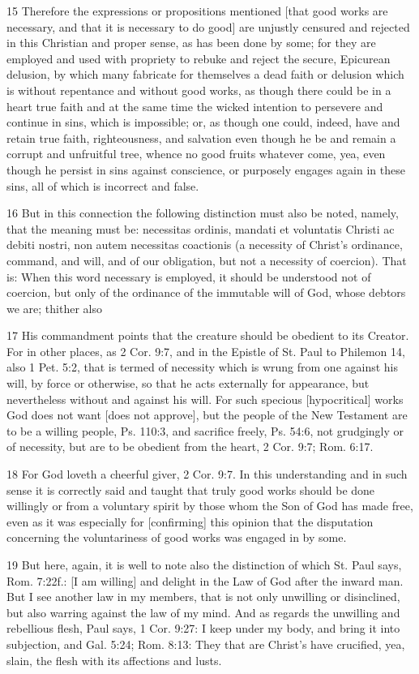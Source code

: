 15 Therefore the expressions or propositions mentioned [that good works are necessary, and that it is necessary to do good] are unjustly censured and rejected in this Christian and proper sense, as has been done by some; for they are employed and used with propriety to rebuke and reject the secure, Epicurean delusion, by which many fabricate for themselves a dead faith or delusion which is without repentance and without good works, as though there could be in a heart true faith and at the same time the wicked intention to persevere and continue in sins, which is impossible; or, as though one could, indeed, have and retain true faith, righteousness, and salvation even though he be and remain a corrupt and unfruitful tree, whence no good fruits whatever come, yea, even though he persist in sins against conscience, or purposely engages again in these sins, all of which is incorrect and false.

16 But in this connection the following distinction must also be noted, namely, that the meaning must be: necessitas ordinis, mandati et voluntatis Christi ac debiti nostri, non autem necessitas coactionis (a necessity of Christ’s ordinance, command, and will, and of our obligation, but not a necessity of coercion). That is: When this word necessary is employed, it should be understood not of coercion, but only of the ordinance of the immutable will of God, whose debtors we are; thither also

17 His commandment points that the creature should be obedient to its Creator. For in other places, as 2 Cor. 9:7, and in the Epistle of St. Paul to Philemon 14, also 1 Pet. 5:2, that is termed of necessity which is wrung from one against his will, by force or otherwise, so that he acts externally for appearance, but nevertheless without and against his will. For such specious [hypocritical] works God does not want [does not approve], but the people of the New Testament are to be a willing people, Ps. 110:3, and sacrifice freely, Ps. 54:6, not grudgingly or of necessity, but are to be obedient from the heart, 2 Cor. 9:7; Rom. 6:17.

18 For God loveth a cheerful giver, 2 Cor. 9:7. In this understanding and in such sense it is correctly said and taught that truly good works should be done willingly or from a voluntary spirit by those whom the Son of God has made free, even as it was especially for [confirming] this opinion that the disputation concerning the voluntariness of good works was engaged in by some.

19 But here, again, it is well to note also the distinction of which St. Paul says, Rom. 7:22f.: [I am willing] and delight in the Law of God after the inward man. But I see another law in my members, that is not only unwilling or disinclined, but also warring against the law of my mind. And as regards the unwilling and rebellious flesh, Paul says, 1 Cor. 9:27: I keep under my body, and bring it into subjection, and Gal. 5:24; Rom. 8:13: They that are Christ’s have crucified, yea, slain, the flesh with its affections and lusts.

